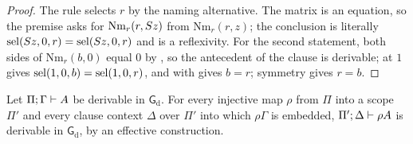 \begin{proof}
The rule selects $r$ by the naming alternative.  The matrix is an equation,
so the premise asks for $\mathrm{Nm}_r(r,S z)$ from
$\mathrm{Nm}_r(r,z)$; the conclusion is literally
$\operatorname{sel}(S z,0,r)=\operatorname{sel}(S z,0,r)$ and is a reflexivity.  For the second
statement, both sides of $\mathrm{Nm}_r(b,0)$ equal $0$ by , so
the antecedent of the clause is derivable;  at $1$ gives
$\operatorname{sel}(1,0,b)=\operatorname{sel}(1,0,r)$, and  with  gives $b=r$;
symmetry gives $r=b$.
\end{proof}

\begin{theorem}
\label{wit:thm:weakening}
Let $\Pi;\Gamma\vdash A$ be derivable in $\mathsf{G}_{\mathrm d}$.  For
every injective map $\rho$ from $\Pi$ into a scope $\Pi'$ and every clause
context $\Delta$ over $\Pi'$ into which $\rho\Gamma$ is embedded,
$\Pi';\Delta\vdash\rho A$ is derivable in $\mathsf{G}_{\mathrm d}$, by an
effective construction.
\end{theorem}

